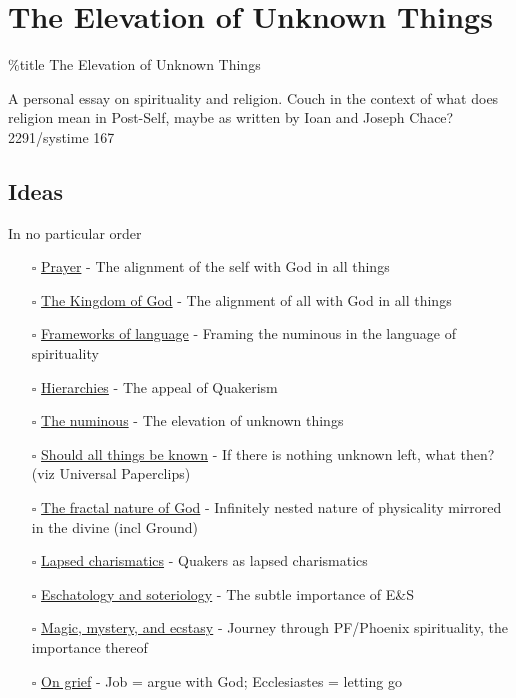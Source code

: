 \hypertarget{the-elevation-of-unknown-things}{%
\section{The Elevation of Unknown Things}\label{the-elevation-of-unknown-things}}

\%title The Elevation of Unknown Things

A personal essay on spirituality and religion. Couch in the context of what does religion mean in Post-Self, maybe as written by Ioan and Joseph Chace? 2291/systime 167

\hypertarget{ideas}{%
\subsection{Ideas}\label{ideas}}

In no particular order

\begin{itemize}
\tightlist
\item[$\square$]
  \href{prayer}{Prayer} - The alignment of the self with God in all things
\item[$\square$]
  \href{kingdom}{The Kingdom of God} - The alignment of all with God in all things
\item[$\square$]
  \href{frameworks}{Frameworks of language} - Framing the numinous in the language of spirituality
\item[$\square$]
  \href{hierarchies}{Hierarchies} - The appeal of Quakerism
\item[$\square$]
  \href{numinous}{The numinous} - The elevation of unknown things
\item[$\square$]
  \href{all-things}{Should all things be known} - If there is nothing unknown left, what then? (viz Universal Paperclips)
\item[$\square$]
  \href{fractal}{The fractal nature of God} - Infinitely nested nature of physicality mirrored in the divine (incl Ground)
\item[$\square$]
  \href{charismatics}{Lapsed charismatics} - Quakers as lapsed charismatics
\item[$\square$]
  \href{ens}{Eschatology and soteriology} - The subtle importance of E\&S
\item[$\square$]
  \href{mme}{Magic, mystery, and ecstasy} - Journey through PF/Phoenix spirituality, the importance thereof
\item[$\square$]
  \href{grief}{On grief} - Job = argue with God; Ecclesiastes = letting go
\end{itemize}

